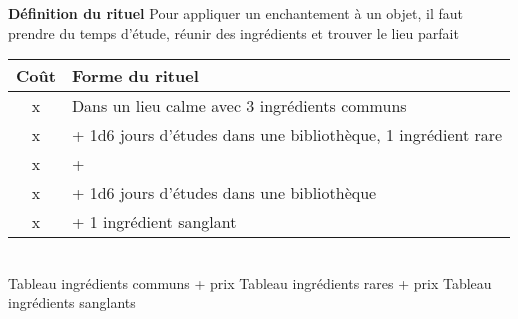 \documentclass[11pt]{article} %
\newcommand{\myjump}[1][1]{\mbox{}\\[#1cm]}
\begin{document}
\newpage
\textbf{\huge Définition du rituel}\newline
Pour appliquer un enchantement à un objet, il faut prendre du temps d'étude, réunir des ingrédients et trouver le lieu parfait

\begin{tabularx}{\linewidth}{|cX|}
\hline

    \textbf{Coût} & \textbf{Forme du rituel}\\
    \hline
    x & Dans un lieu calme avec 3 ingrédients communs\\
    x & + 1d6 jours d'études dans une bibliothèque, 1 ingrédient rare\\
    x & + \\
    x & + 1d6 jours d'études dans une bibliothèque\\
    x & + 1 ingrédient sanglant\\


\hline
\end{tabularx}


\myjump
Tableau ingrédients communs + prix\newline
Tableau ingrédients rares + prix  \newline
Tableau ingrédients sanglants\newline
\end{document}
